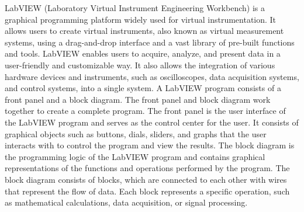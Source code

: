 \documentclass[journal=jacsat,manuscript=article]{achemso}
\begin{document}
LabVIEW (Laboratory Virtual Instrument Engineering Workbench) is a
graphical programming platform widely used for virtual
instrumentation. It allows users to create virtual instruments, also
known as virtual measurement systems, using a drag-and-drop interface
and a vast library of pre-built functions and tools. LabVIEW enables
users to acquire, analyze, and present data in a user-friendly and
customizable way. It also allows the integration of various hardware
devices and instruments, such as oscilloscopes, data acquisition
systems, and control systems, into a single system. A LabVIEW program
consists of a front panel and a block diagram. The front panel and
block diagram work together to create a complete program. The front
panel is the user interface of the LabVIEW program and serves as the
control center for the user. It consists of graphical objects such as
buttons, dials, sliders, and graphs that the user interacts with to
control the program and view the results. The block diagram is the
programming logic of the LabVIEW program and contains graphical
representations of the functions and operations performed by the
program. The block diagram consists of blocks, which are connected to
each other with wires that represent the flow of data. Each block
represents a specific operation, such as mathematical calculations,
data acquisition, or signal processing.
\end{document}
